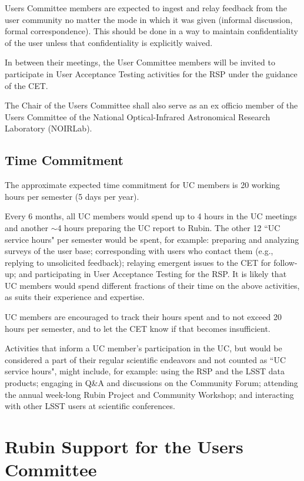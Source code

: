 \documentclass[OPS,toc]{lsstdoc}
\begin{document}
Users Committee members are expected to ingest and relay feedback from the user community no matter the mode in which it was given (informal discussion, formal correspondence).
This should be done in a way to maintain confidentiality of the user unless that confidentiality is explicitly waived. 

In between their meetings, the User Committee members will be invited to participate in User Acceptance Testing activities for the RSP under the guidance of the CET.  

The Chair of the Users Committee shall also serve as an ex officio member of the Users Committee of the National Optical-Infrared Astronomical Research Laboratory (NOIRLab). 

\subsection{Time Commitment}

The approximate expected time commitment for UC members is 20 working hours per semester (5 days per year).

Every 6 months, all UC members would spend up to 4 hours in the UC meetings and another $\sim$4 hours preparing the UC report to Rubin.
The other 12 ``UC service hours" per semester would be spent, for example: preparing and analyzing surveys of the user base; corresponding with users who contact them (e.g., replying to unsolicited feedback); relaying emergent issues to the CET for follow-up; and participating in User Acceptance Testing for the RSP. 
It is likely that UC members would spend different fractions of their time on the above activities, as suits their experience and expertise.

UC members are encouraged to track their hours spent and to not exceed 20 hours per semester, and to let the CET know if that becomes insufficient. 

Activities that inform a UC member's participation in the UC, but would be considered a part of their regular scientific endeavors and not counted as ``UC service hours", might include, for example: using the RSP and the LSST data products; engaging in Q&A and discussions on the Community Forum; attending the annual week-long Rubin Project and Community Workshop; and interacting with other LSST users at scientific conferences.

\section{Rubin Support for the Users Committee}
\end{document}
